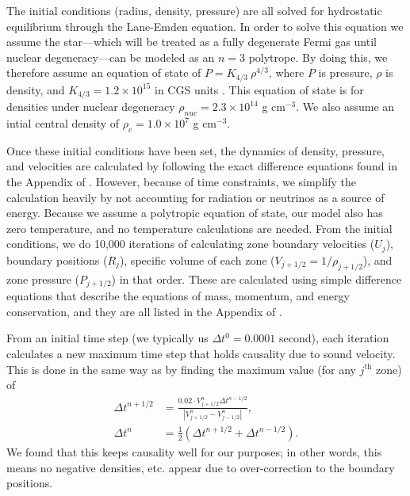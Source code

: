 \documentclass[12pt]{article}
\begin{document}
The initial conditions (radius, density, pressure) are all solved for
hydrostatic equilibrium through the Lane-Emden equation. In order to solve
this equation we assume the star---which will be treated as a fully degenerate
Fermi gas until nuclear degeneracy---can be modeled as an $n=3$ polytrope. By
doing this, we therefore assume an equation of state of
$P = K_{4/3}\ \rho^{4/3}$, where $P$ is pressure, $\rho$ is density, and
$K_{4/3} = 1.2 \times 10^{15}$ in CGS units \citep{arnett66}. This equation of
state is for densities under nuclear degeneracy
$\rho_{nuc} = 2.3 \times 10^{14}$ g cm$^{-3}$. We also assume an intial
central density of $\rho_c = 1.0 \times 10^7$ g cm$^{-3}$.


Once these initial conditions have been set, the dynamics of density, pressure,
and velocities are calculated by following the exact difference equations found
in the Appendix of \citet{arnett66}. However, because of time constraints, we
simplify the calculation heavily by not accounting for radiation or neutrinos
as a source of energy. Because we assume a polytropic equation of state, our
model also has zero temperature, and no temperature calculations are needed.
From the initial conditions, we do 10,000 iterations of calculating zone
boundary velocities ($U_j$), boundary positions ($R_j$), specific volume of
each zone ($V_{j + 1/2} = 1 / \rho_{j + 1/2}$), and zone pressure
($P_{j + 1/2}$) in that order. These are calculated using simple difference
equations that describe the equations of mass, momentum, and energy
conservation, and they are all listed in the Appendix of \citet{arnett66}.

From an initial time step (we typically us $\Delta t^0 = 0.0001$ second), each
iteration calculates a new maximum time step that holds causality due to sound
velocity. This is done in the same way as \citet{colgatewhite64} by finding the
maximum value (for any $j^\text{th}$ zone) of
$$
\begin{aligned}
\Delta t^{n + 1/2}
&= \frac{0.02 \cdot V^n_{j + 1/2} \Delta t^{n - 1/2}}
        {|V^n_{j + 1/2} - V^n_{j - 1/2}|}, \\
\Delta t^n
&= \frac{1}{2} (\Delta t^{n + 1/2} + \Delta t^{n - 1/2}).
\end{aligned}
$$
We found that this keeps causality well for our purposes; in other words, this
means no negative densities, etc. appear due to over-correction to the
boundary positions.
\end{document}
